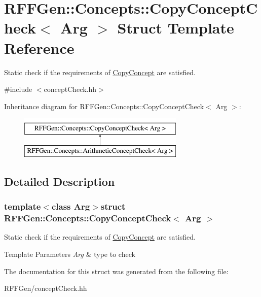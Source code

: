\hypertarget{structRFFGen_1_1Concepts_1_1CopyConceptCheck}{\section{R\-F\-F\-Gen\-:\-:Concepts\-:\-:Copy\-Concept\-Check$<$ Arg $>$ Struct Template Reference}
\label{structRFFGen_1_1Concepts_1_1CopyConceptCheck}
}


Static check if the requirements of \hyperlink{structRFFGen_1_1Concepts_1_1CopyConcept}{Copy\-Concept} are satisfied.  




{\ttfamily \#include $<$concept\-Check.\-hh$>$}

Inheritance diagram for R\-F\-F\-Gen\-:\-:Concepts\-:\-:Copy\-Concept\-Check$<$ Arg $>$\-:\begin{figure}[H]
\begin{center}
\leavevmode
\includegraphics[height=2.000000cm]{structRFFGen_1_1Concepts_1_1CopyConceptCheck}
\end{center}
\end{figure}


\subsection{Detailed Description}
\subsubsection*{template$<$class Arg$>$struct R\-F\-F\-Gen\-::\-Concepts\-::\-Copy\-Concept\-Check$<$ Arg $>$}

Static check if the requirements of \hyperlink{structRFFGen_1_1Concepts_1_1CopyConcept}{Copy\-Concept} are satisfied. 


\begin{DoxyTemplParams}{Template Parameters}
{\em Arg} & type to check \\
\hline
\end{DoxyTemplParams}


The documentation for this struct was generated from the following file\-:\begin{DoxyCompactItemize}
\item 
R\-F\-F\-Gen/concept\-Check.\-hh\end{DoxyCompactItemize}
